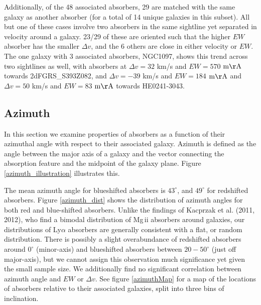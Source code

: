 \documentclass[iop]{emulateapj-rtx4}
\begin{document}
Additionally, of the 48 associated absorbers, 29 are matched with the same galaxy as another absorber (for a total of 14 unique galaxies in this subset). All but one of these cases involve two absorbers in the same sightline yet separated in velocity around a galaxy. 23/29 of these are oriented such that the higher $EW$ absorber has the smaller $\Delta v$, and the 6 others are close in either velocity or $EW$. The one galaxy with 3 associated absorbers, NGC1097, shows this trend across two sightlines as well, with absorbers at $\Delta v = 32$ km/s and $EW = 570$ $\rm m\AA$ towards 2dFGRS\_S393Z082, and $\Delta v = -39$ km/s and $EW = 184$ $\rm m\AA$ and $\Delta v = 50$ km/s and $EW = 83$ $\rm m\AA$ towards HE0241-3043.


\subsection{Azimuth}
In this section we examine properties of absorbers as a function of their azimuthal angle with respect to their associated galaxy. Azimuth is defined as the angle between the major axis of a galaxy and the vector connecting the absorption feature and the midpoint of the galaxy plane. Figure \ref{azimuth_illustration} illustrates this. 

The mean azimuth angle for blueshifted absorbers is $43^{\circ}$, and $49^{\circ}$ for redshifted absorbers. Figure \ref{azimuth_dist} shows the distribution of azimuth angles for both red and blue-shifted absorbers. Unlike the findings of Kacprzak et al. (2011, 2012), who find a bimodal distribution of Mg\,{\sc ii} absorbers around galaxies, our distributions of Ly$\alpha$ absorbers are generally consistent with a flat, or random distribution. There is possibly a slight overabundance of redshifted absorbers around $0^{\circ}$ (minor-axis) and blueshifted absorbers between $20-50^{\circ}$ (just off major-axis), but we cannot assign this observation much significance yet given the small sample size. We additionally find no significant correlation between azimuth angle and $EW$ or $\Delta v$. See figure \ref{azimuthMap} for a map of the locations of absorbers relative to their associated galaxies, split into three bins of inclination.
\end{document}

